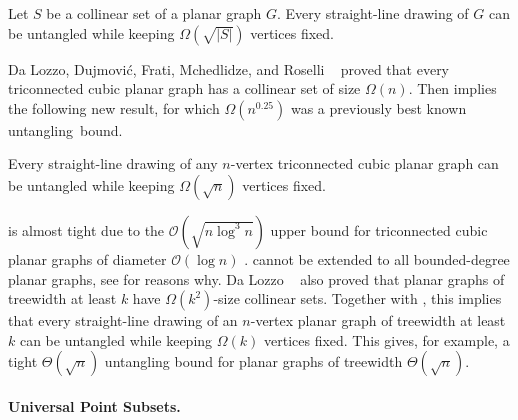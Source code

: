 \begin{thm}
Let $S$ be a collinear set of a planar graph $G$. Every straight-line drawing of $G$ can be untangled while keeping $\Omega(\sqrt{|S|})$ vertices fixed.
\end{thm}

Da Lozzo,
Dujmovi\'c, Frati, Mchedlidze, and Roselli%
~\cite{dalozzo.dujmovic.ea:drawing}  proved that
every triconnected cubic planar graph has a collinear set of size
$\Omega(n)$. Then  implies the following new result,
for which $\Omega(n^{0.25})$ was a previously best known \mbox{untangling
bound.}

\begin{cor}
Every straight-line drawing of any $n$-vertex triconnected cubic planar
graph can be untangled while keeping $\Omega(\sqrt{n})$ vertices fixed.
\end{cor}

 is almost tight due to the $\mathcal{O}(\sqrt{n\log^3n })$ upper bound for triconnected cubic planar graphs of diameter $\mathcal{O}(\log n)$ \cite{c-upg-10}.  cannot be extended to all bounded-degree planar graphs, see \cite{dujmovic:utility,DBLP:journals/dm/Owens81} for
reasons why.  Da Lozzo \etal~\cite{dalozzo.dujmovic.ea:drawing} also proved that planar graphs of treewidth at least
$k$ have $\Omega(k^2)$-size collinear sets. Together with
, this implies that 
%
every straight-line drawing of an $n$-vertex planar graph of treewidth
at least $k$ can be untangled while keeping $\Omega(k)$ vertices fixed. 
%
This gives, for example, a tight $\Theta(\sqrt{n})$
untangling bound for planar graphs of treewidth
$\Theta(\sqrt{n})$.  



 \paragraph{Universal Point Subsets.}%


